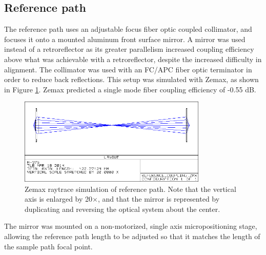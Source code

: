 \subsection{Reference path}
\label{sec:reference_path}


The reference path uses an adjustable focus fiber optic coupled collimator, and focuses it onto a mounted aluminum front surface mirror. A mirror was used instead of a retroreflector as its greater parallelism increased coupling efficiency above what was achievable with a retroreflector, despite the increased difficulty in alignment. The collimator was used with an FC/APC fiber optic terminator in order to reduce back reflections. %
This setup was simulated with Zemax, as shown in Figure \ref{fig:reference_zemax}. Zemax predicted a single mode fiber coupling efficiency of -0.55 dB.%

\begin{figure}[h!]
\centering
\includegraphics[width=0.8\textwidth]{Images/Zemax/RP-raytrace.png}
\caption[Zemax raytrace simulation of reference path.]{Zemax raytrace simulation of reference path. Note that the vertical axis is enlarged by 20$\times$, and that the mirror is represented by duplicating and reversing the optical system about the center.\label{fig:reference_zemax}}
\end{figure}

The mirror was mounted on a non-motorized, single axis micropositioning stage, allowing the reference path length to be adjusted so that it matches the length of the sample path focal point.


